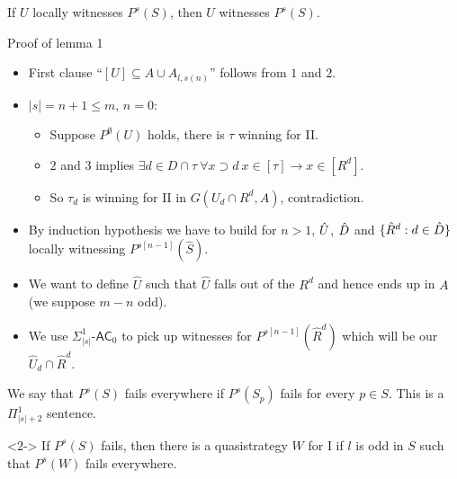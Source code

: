 \documentclass{beamer} %
\begin{document}

\begin{frame}
    \begin{lemma}[1]
        If $U$ locally witnesses $P^s(S)$, then $U$ witnesses $P^s(S)$.\label{nolocal}
    \end{lemma}
\end{frame}


\begin{frame}{Proof of lemma 1}
        \begin{itemize} 
            \item<1-> First clause ``$[U] \subseteq A \cup A_{l, s(n)}$'' follows from $1$ and $2$.
            \item<2-> $|s| = n+1 \leq m$, $n=0$: \begin{itemize}
                \item<3-> Suppose $P^{\emptyset}(U)$ holds, there is $\tau$ winning for II\@. 
                \item<4-> $2$ and $3$ implies $\exists d \in D \cap \tau \ \forall x \supset d \ x \in [\tau] \rightarrow 
                x \in [R^d]$. 
                \item<5-> So $\tau_d$ is winning for II in $G(U_d \cap R^d, A)$, contradiction.
            \end{itemize} 
            \item<6-> By induction hypothesis we have to build for $n>1$, $\Hat{U}$, $\Hat{D}$ and 
            $\{\Hat{R}^d : d \in \Hat{D}\}$ locally witnessing $P^{s[n-1]}(\hat{S})$.
            \item<7-> We want to define $\hat{U}$ such that $\hat{U}$ falls out of the $R^d$ and 
            hence ends up in $A$ (we suppose $m-n$ odd). 
            \item<8-> We use $\Sigma^1_{|s|}$-$\mathsf{AC}_0$ to pick up witnesses for $P^{s[n-1]}(\hat{R}^d)$
            which will be our $\hat{U}_d \cap \hat{R}^d$.

        \end{itemize}
\end{frame}


\begin{frame}

    \begin{definition}
        We say that $P^s(S)$ fails everywhere if $P^s(S_p)$ fails for every $p \in S$. This is a $\Pi^1_{|s|+2}$ 
        sentence.
    \end{definition}
    \begin{lemma}[2]<2->
        If $P^s(S)$ fails, then there is a quasistrategy $W$ for I if $l$ is odd in $S$ such that 
        $P^s(W)$ fails everywhere.\label{failure}
    \end{lemma}
\end{frame}
\end{document}
